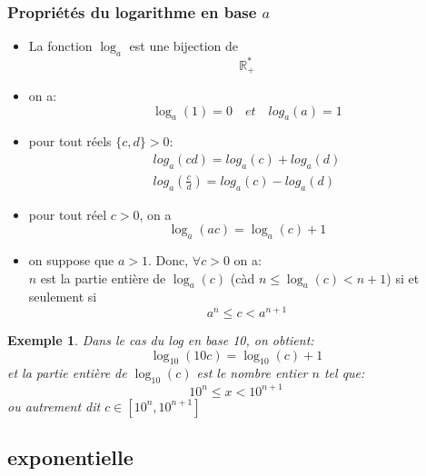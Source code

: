 	\subsubsection{Propri\'et\'es du logarithme en base $a$}
		\begin{itemize}
			\item La fonction $\log_a$ est une bijection de $$\mathbb{R}^*_+$$
			\item on a:
			\begin{equation*}
					\log_a(1)=0\quad et \quad log_a(a)=1	
    			\end{equation*}
			\item pour tout r\'eels $\{c, d\} >0$:
			\begin{align*}
    				log_a(cd)=log_a(c)+log_a(d) \\
				log_a(\frac{c}{d})=log_a(c)-log_a(d)
    			\end{align*}
			\item pour tout r\'eel $c>0$, on a
			\begin{equation*}
   				\log_a(ac)=\log_a(c)+1		
   			\end{equation*}
			\item on suppose que $a>1$. Donc, $\forall c>0$ on a: \\
				$n$ est la partie enti\`ere de $\log_a(c)$ (c\`ad $n \leq \log_a(c) < n+1$) si et seulement si
				\begin{equation*}
					a^n\leq c < a^{n+1}
   				 \end{equation*}	
		\end{itemize}
		\newtheorem{example}{Exemple}
		\begin{example}
			Dans le cas du log en base 10, on obtient:
			\begin{equation*}
				\log_{10}(10c)=\log_10(c)+1
			\end{equation*}
			et la partie enti\`ere de $\log_10(c)$ est le nombre entier $n$ tel que:
			\begin{equation}
				10^n\leq x < 10^{n+1}
			\end{equation}
			ou autrement dit $c \in [10^n,10^{n+1}]$
		\end{example}

	\subsection{exponentielle}

	

